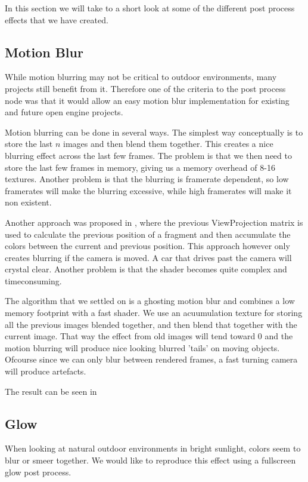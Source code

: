 In this section we will take to a short look at some of the different
post process effects that we have created.

\subsection{Motion Blur}

While motion blurring may not be critical to outdoor environments,
many projects still benefit from it. Therefore one of the criteria
to the post process node was that it would allow an easy motion blur
implementation for existing and future open engine projects.

Motion blurring can be done in several ways. The simplest way
conceptually is to store the last $n$ images and then blend them
together. This creates a nice blurring effect across the last few
frames. The problem is that we then need to store the last few frames
in memory, giving us a memory overhead of 8-16 textures. Another
problem is that the blurring is framerate dependent, so low framerates
will make the blurring excessive, while high framerates will make it
non existent.

Another approach was proposed in , where
the previous ViewProjection matrix is used to calculate the previous
position of a fragment and then accumulate the colors between the
current and previous position. This approach however only creates
blurring if the camera is moved. A car that drives past the camera
will crystal clear. Another problem is that the shader becomes quite
complex and timeconsuming.

The algorithm that we settled on is a ghosting motion blur and
combines a low memory footprint with a fast shader. We use an
acuumulation texture for storing all the previous images blended
together, and then blend that together with the current image. That
way the effect from old images will tend toward 0 and the motion
blurring will produce nice looking blurred 'tails' on moving
objects. Ofcourse since we can only blur between rendered frames, a
fast turning camera will produce artefacts.

The result can be seen in 

\subsection{Glow}

When looking at natural outdoor environments in bright sunlight,
colors seem to blur or smeer together. We would like to reproduce this
effect using a fullscreen glow post process. 

